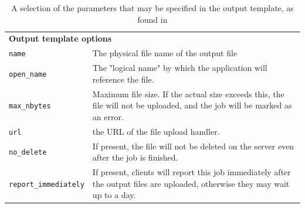 \begin{table} 
\caption{A selection of the parameters that may be specified in the output template, as found in \cite{boincwiki}}
\begin{tabular}{lp{11.6cm}}\toprule
 \multicolumn{2}{l}{\textbf{Output template options} \cite{boincwiki}   }\\ \cmidrule(r){1-2}
 \verb|name| & The physical file name of the output file\\
\verb|open_name| & The "logical name" by which the application will reference the file.\\
\verb|max_nbytes| & Maximum file size. If the actual size exceeds this, the file will not be uploaded, and the job will be marked as an error.\\
\verb|url| & the URL of the file upload handler. \\ 
\verb|no_delete| & If present, the file will not be deleted on the server even after the job is finished.\\
\verb|report_immediately| & If present, clients will report this job immediately after the output files are uploaded, otherwise they may wait up to a day. 
\\  \bottomrule
\end{tabular}\label{tab:api}
\end{table}
 
